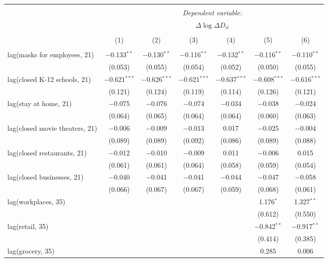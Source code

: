 \begin{tabular}{@{\extracolsep{1pt}}lcccccc} 
\\[-1.8ex]\hline 
\hline \\[-1.8ex] 
 & \multicolumn{6}{c}{\textit{Dependent variable:}} \\ 
\cline{2-7} 
 & \multicolumn{6}{c}{$\Delta \log \Delta D_{it}$} \\ 
\\[-1.8ex] & (1) & (2) & (3) & (4) & (5) & (6)\\ 
\hline \\[-1.8ex] 
 lag(masks for employees, 21) & $-$0.133$^{**}$ & $-$0.130$^{**}$ & $-$0.116$^{**}$ & $-$0.132$^{**}$ & $-$0.116$^{**}$ & $-$0.110$^{**}$ \\ 
  & (0.053) & (0.055) & (0.054) & (0.052) & (0.050) & (0.055) \\ 
  lag(closed K-12 schools, 21) & $-$0.621$^{***}$ & $-$0.626$^{***}$ & $-$0.621$^{***}$ & $-$0.637$^{***}$ & $-$0.608$^{***}$ & $-$0.616$^{***}$ \\ 
  & (0.121) & (0.124) & (0.119) & (0.114) & (0.126) & (0.121) \\ 
  lag(stay at home, 21) & $-$0.075 & $-$0.076 & $-$0.074 & $-$0.034 & $-$0.038 & $-$0.024 \\ 
  & (0.064) & (0.065) & (0.064) & (0.064) & (0.060) & (0.063) \\ 
  lag(closed movie theaters, 21) & $-$0.006 & $-$0.009 & $-$0.013 & 0.017 & $-$0.025 & $-$0.004 \\ 
  & (0.089) & (0.089) & (0.092) & (0.086) & (0.089) & (0.088) \\ 
  lag(closed restaurants, 21) & $-$0.012 & $-$0.010 & $-$0.009 & 0.011 & $-$0.006 & 0.015 \\ 
  & (0.061) & (0.061) & (0.064) & (0.058) & (0.059) & (0.054) \\ 
  lag(closed businesses, 21) & $-$0.040 & $-$0.041 & $-$0.041 & $-$0.044 & $-$0.047 & $-$0.058 \\ 
  & (0.066) & (0.067) & (0.067) & (0.059) & (0.068) & (0.061) \\ 
  lag(workplaces, 35) &  &  &  &  & 1.176$^{*}$ & 1.327$^{**}$ \\ 
  &  &  &  &  & (0.612) & (0.550) \\ 
  lag(retail, 35) &  &  &  &  & $-$0.842$^{**}$ & $-$0.917$^{**}$ \\ 
  &  &  &  &  & (0.414) & (0.385) \\ 
  lag(grocery, 35) &  &  &  &  & 0.285 & 0.006 \\ 

\end{tabular}
